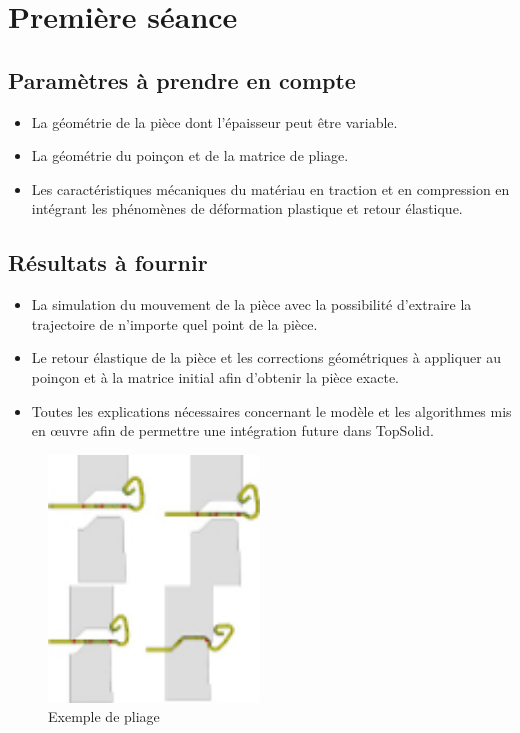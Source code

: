 \section{Première séance}

\subsection{Paramètres à prendre en compte}
\begin{itemize}
    \item La géométrie de la pièce dont l'épaisseur peut être variable.
    \item La géométrie du poinçon et de la matrice de pliage.
    \item Les caractéristiques mécaniques du matériau en traction et en compression en intégrant  les phénomènes de déformation plastique et retour élastique.
\end{itemize}
\subsection{Résultats à fournir}
\begin{itemize}
    \item La simulation du mouvement de la pièce avec la possibilité d'extraire la trajectoire de n'importe quel point de la pièce.
    \item Le retour élastique de la pièce et les corrections géométriques à appliquer au poinçon et à la matrice initial afin d'obtenir la pièce exacte.
    \item Toutes les explications nécessaires concernant le modèle et les algorithmes mis en œuvre afin de permettre une intégration future dans TopSolid.
\end{itemize}
\begin{figure}[H]
    \begin{center}
        \includegraphics[width=0.5\textwidth]{img/img1.jpg}
        \caption{Exemple de pliage}
        \label{img1}
    \end{center}
\end{figure}

